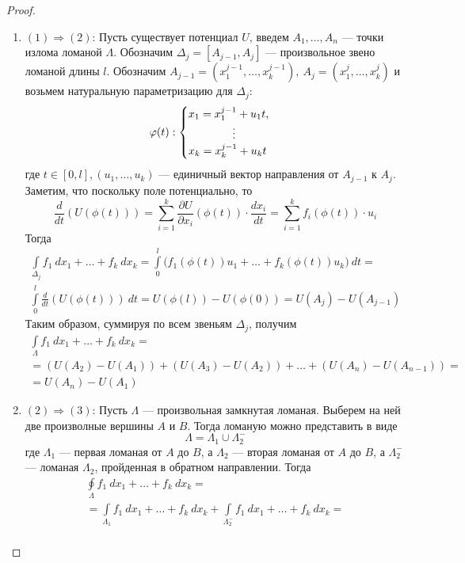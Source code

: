 \begin{proof}\tab
    \begin{enumerate}
        \item $(1)\Rightarrow(2)$: Пусть существует потенциал $U$, введем $A_1,\dots,A_n$ --- точки излома ломаной $\Lambda$. Обозначим $\Delta_j=[A_{j-1}, A_{j}]$ --- произвольное звено ломаной длины $l$. Обозначим $A_{j-1}=(x_1^{j-1},\dots,x_k^{j-1}),\ A_{j}=(x_1^{j},\dots,x_k^{j})$ и возьмем натуральную параметризацию для $\Delta_j$:
        \[\phi(t): \begin{cases}
            x_1=x_1^{j-1}+u_1 t,\\
            \tab[1.4cm]\vdots\\
            x_k=x_k^{j-1}+u_k t
        \end{cases}\]
        где $t\in [0,l], (u_1,\dots,u_k)$ --- единичный вектор направления от $A_{j-1}$ к $A_j$. Заметим, что поскольку поле потенциально, то
        \[\frac{d}{dt}(U(\phi(t)))=\sum\limits_{i=1}^{k}\frac{\partial U}{\partial x_i}(\phi(t))\cdot \frac{dx_i}{dt}=\sum\limits_{i=1}^{k}f_i(\phi(t))\cdot u_i\]
        Тогда
        \begin{multline*}
            \int\limits_{\Delta_j}f_1\ dx_1+\dots+f_k\ dx_k=\int\limits_{0}^{l}\Big(f_1(\phi(t))u_1+\dots+f_k(\phi(t))u_k\Big)\ dt=\\
            \int\limits_{0}^{l}\frac{d}{dt}(U(\phi(t)))\ dt=U(\phi(l))-U(\phi(0))=U(A_{j})-U(A_{j-1})
        \end{multline*}
        Таким образом, суммируя по всем звеньям $\Delta_j$, получим
        \begin{multline*}
            \int\limits_{\Lambda}f_1\ dx_1+\dots+f_k\ dx_k=\\
            =(U(A_2)-U(A_1))+(U(A_3)-U(A_2))+\dots+(U(A_n)-U(A_{n-1}))=\\
            =U(A_n)-U(A_1)
        \end{multline*}
        \item $(2)\Rightarrow(3)$: Пусть $\Lambda$ --- произвольная замкнутая ломаная. Выберем на ней две произволные вершины $A$ и $B$. Тогда ломаную можно представить в виде
        \[\Lambda=\Lambda_1\cup\Lambda_2^-\]
        где $\Lambda_1$ --- первая ломаная от $A$ до $B$, а $\Lambda_2$ --- вторая ломаная от $A$ до $B$, а $\Lambda_2^-$ --- ломаная $\Lambda_2$, пройденная в обратном направлении. Тогда 
        \begin{multline*}
            \oint\limits_{\Lambda}f_1\ dx_1+\dots+f_k\ dx_k=\\
            =\int\limits_{\Lambda_1}f_1\ dx_1+\dots+f_k\ dx_k+\int\limits_{\Lambda_2^-}f_1\ dx_1+\dots+f_k\ dx_k=\\

\end{multline*}
\end{enumerate}
\end{proof}
